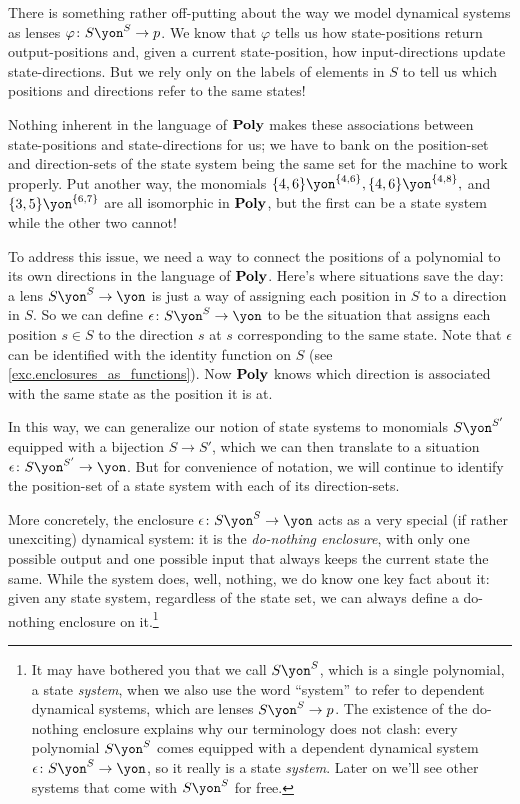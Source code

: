 \documentclass[Book-Poly]{subfiles}
\begin{document}
\begin{example} \label{ex.do_nothing}
There is something rather off-putting about the way we model dynamical systems as lenses $\varphi\colon S\yon^S\to p$.
We know that $\varphi$ tells us how state-positions return output-positions and, given a current state-position, how input-directions update state-directions.
But we rely only on the labels of elements in $S$ to tell us which positions and directions refer to the same states!

Nothing inherent in the language of $\mathbf{Poly}$ makes these associations between state-positions and state-directions for us; we have to bank on the position-set and direction-sets of the state system being the same set for the machine to work properly.
Put another way, the monomials $\{4,6\}\yon^{\{4,6\}},\{4,6\}\yon^{\{4,8\}},$ and $\{3,5\}\yon^{\{6,7\}}$ are all isomorphic in $\mathbf{Poly}$, but the first can be a state system while the other two cannot!

To address this issue, we need a way to connect the positions of a polynomial to its own directions in the language of $\mathbf{Poly}$.
Here's where situations save the day: a lens $S\yon^S\to\yon$ is just a way of assigning each position in $S$ to a direction in $S$.
So we can define $\epsilon\colon S\yon^S\to\yon$ to be the situation that assigns each position $s\in S$ to the direction $s$ at $s$ corresponding to the same state.
Note that $\epsilon$ can be identified with the identity function on $S$ (see \cref{exc.enclosures_as_functions}).
Now $\mathbf{Poly}$ knows which direction is associated with the same state as the position it is at.

In this way, we can generalize our notion of state systems to monomials $S\yon^{S'}$ equipped with a bijection $S\to S'$, which we can then translate to a situation $\epsilon\colon S\yon^{S'}\to\yon$.
But for convenience of notation, we will continue to identify the position-set of a state system with each of its direction-sets.

More concretely, the enclosure $\epsilon\colon S\yon^S\to\yon$ acts as a very special (if rather unexciting) dynamical system: it is the \emph{do-nothing enclosure}, with only one possible output and one possible input that always keeps the current state the same.
While the system does, well, nothing, we do know one key fact about it: given any state system, regardless of the state set, we can always define a do-nothing enclosure on it.\footnote{It may have bothered you that we call $S\yon^S$, which is a single polynomial, a state \emph{system}, when we also use the word ``system'' to refer to dependent dynamical systems, which are lenses $S\yon^S\to p$.
The existence of the do-nothing enclosure explains why our terminology does not clash: every polynomial $S\yon^S$ comes equipped with a dependent dynamical system $\epsilon\colon S\yon^S\to\yon$, so it really is a state \emph{system}.
Later on we'll see other systems that come with $S\yon^S$ for free.}


\end{example}
\end{document}
